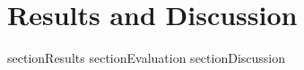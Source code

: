 \chapter{Results and Discussion}
section{Results}\label{sec:results}
section{Evaluation}\label{sec:evaluation}
section{Discussion}\label{sec:discussion}